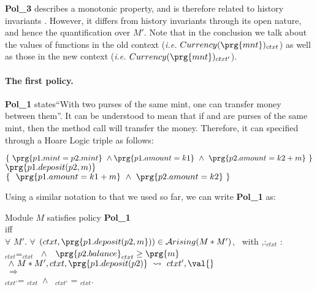 \noindent
{\bf Pol\_3} describes a
monotonic property, and is therefore related to   history invariants \cite{usinghistory}. However, it differs from history invariants through its 
open nature, and hence the quantification over $M'$. Note that in the conclusion  we talk about  the values of functions in the old context ({\it i.e.}  $Currency(\prg{mnt})_{ctxt}$) as well as those in the new context ({\it i.e.} $Currency(\prg{mnt})_{ctxt'}$).

 


 \paragraph{The first policy.}
{\bf Pol\_1}  states``With two purses of the same mint, one can transfer
money between them''. It can be understood to mean that if  and  are    purses of the same mint,
then the method call    will transfer the money. Therefore, it can 
 specified   through a Hoare  Logic triple as 
follows:
\begin{center}
$ \{ \ \prg{p1.mint=p2.mint} \ \wedge  \prg{ p1.amount=k1}\  \wedge \ \prg{p2.amount = k2 +m}\   \}$
 \\
$ \prg{p1.deposit(p2,m)} $
 \\
$ \{ \ \ \prg{p1.amount=k1+m}\  \wedge\  \prg{p2.amount = k2}  \  \} $
  \end{center}

Using a similar notation to that we used so far, we can write {\bf Pol\_1} as: %


\begin{shaded}
\begin{center}
Module $M$ satisfies policy {\bf Pol\_1}\\
 iff
\\
$\forall$  $M'$. %
 $\forall$  $(ctxt, \prg{p1.deposit(p2,m}))\in{\mathcal A}rising(M*M')$, \ with ,:$_{ctxt}$ :\ \\%
 $_{ctxt}$=$_{ctxt}\ $      $\ \wedge\  \  \  \prg{p2.balance}_{ctxt} \geq \prg{m}$
\\ 
 $\ \wedge \    M*M',  ctxt,  \prg{p1.deposit(p2)}  \ \leadsto \ ctxt', \val{}$ \\
$ \ \Rightarrow\ $ 
\\
$_{ctxt'}$= $_{ctxt}$\ $ \wedge$ \ $_{ctxt'}$ = $_{ctxt}$.
 \end{center}
\end{shaded}

